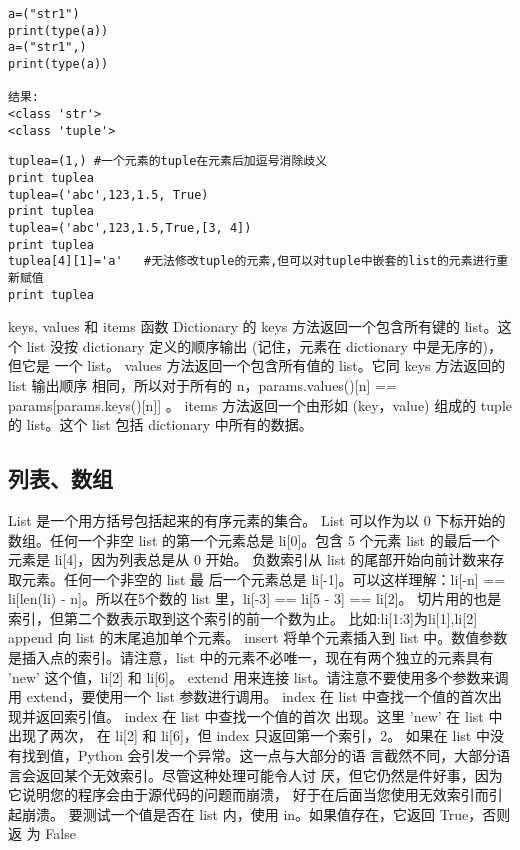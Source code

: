 \documentclass[twoside,11pt]{book}
\begin{document}
\begin{lstlisting}
a=("str1")
print(type(a))
a=("str1",)
print(type(a))

结果:
<class 'str'>
<class 'tuple'>
\end{lstlisting}

\begin{lstlisting}
tuplea=(1,) #一个元素的tuple在元素后加逗号消除歧义
print tuplea
tuplea=('abc',123,1.5, True)
print tuplea
tuplea=('abc',123,1.5,True,[3, 4])
print tuplea
tuplea[4][1]='a'   #无法修改tuple的元素,但可以对tuple中嵌套的list的元素进行重新赋值
print tuplea
\end{lstlisting}

keys, values 和 items 函数
Dictionary 的 keys 方法返回一个包含所有键的 list。这个 list 没按 dictionary 定义的顺序输出 (记住，元素在 dictionary 中是无序的)，但它是 一个 list。
values 方法返回一个包含所有值的 list。它同 keys 方法返回的 list 输出顺序 相同，所以对于所有的 n，params.values()[n] == params[params.keys()[n]] 。
items 方法返回一个由形如 (key，value) 组成的 tuple 的 list。这个 list 包括 dictionary 中所有的数据。

\subsection{列表、数组}
List 是一个用方括号包括起来的有序元素的集合。
List 可以作为以 0 下标开始的数组。任何一个非空 list 的第一个元素总是
li[0]。包含 5 个元素 list 的最后一个元素是 li[4]，因为列表总是从 0 开始。
负数索引从 list 的尾部开始向前计数来存取元素。任何一个非空的 list 最 后一个元素总是 li[-1]。可以这样理解：li[-n] == li[len(li) - n]。所以在5个数的 list 里，li[-3] == li[5 - 3] == li[2]。
切片用的也是索引，但第二个数表示取到这个索引的前一个数为止。
比如:li[1:3]为li[1],li[2]
append 向 list 的末尾追加单个元素。
insert 将单个元素插入到 list 中。数值参数是插入点的索引。请注意，list 中的元素不必唯一，现在有两个独立的元素具有 'new' 这个值，li[2] 和
li[6]。
extend 用来连接 list。请注意不要使用多个参数来调用 extend，要使用一个 list 参数进行调用。
index 在 list 中查找一个值的首次出现并返回索引值。
index 在 list 中查找一个值的首次 出现。这里 'new' 在 list 中出现了两次， 在 li[2] 和 li[6]，但 index 只返回第一个索引，2。
如果在 list 中没有找到值，Python 会引发一个异常。这一点与大部分的语 言截然不同，大部分语言会返回某个无效索引。尽管这种处理可能令人讨 厌，但它仍然是件好事，因为它说明您的程序会由于源代码的问题而崩溃， 好于在后面当您使用无效索引而引起崩溃。
要测试一个值是否在 list 内，使用 in。如果值存在，它返回 True，否则返 为 False
\end{document}
